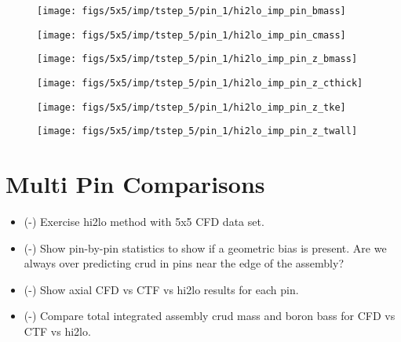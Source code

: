 \begin{figure}[H]
    \centering
    \texttt{[image: figs/5x5/imp/tstep\_5/pin\_1/hi2lo\_imp\_pin\_bmass]}
    \caption{}
    \label{fig:hi2loimppinbmass}
\end{figure}
\begin{figure}[H]
    \centering
    \texttt{[image: figs/5x5/imp/tstep\_5/pin\_1/hi2lo\_imp\_pin\_cmass]}
    \caption{}
    \label{fig:hi2loimppincmass}
\end{figure}
\begin{figure}[H]
    \centering
    \texttt{[image: figs/5x5/imp/tstep\_5/pin\_1/hi2lo\_imp\_pin\_z\_bmass]}
    \caption{}
    \label{fig:hi2loimppinzbmass}
\end{figure}
\begin{figure}[H]
    \centering
    \texttt{[image: figs/5x5/imp/tstep\_5/pin\_1/hi2lo\_imp\_pin\_z\_cthick]}
    \caption{}
    \label{fig:hi2loimppinzcthick}
\end{figure}
\begin{figure}[H]
    \centering
    \texttt{[image: figs/5x5/imp/tstep\_5/pin\_1/hi2lo\_imp\_pin\_z\_tke]}
    \caption{}
    \label{fig:hi2loimppinztke}
\end{figure}
\begin{figure}[H]
    \centering
    \texttt{[image: figs/5x5/imp/tstep\_5/pin\_1/hi2lo\_imp\_pin\_z\_twall]}
    \caption{}
    \label{fig:hi2loimppinztwall}
\end{figure}

\section{Multi Pin Comparisons}

\begin{itemize}
    \item (\checkmark-) Exercise hi2lo method with 5x5 CFD data set.
    \item (\checkmark-) Show pin-by-pin statistics to show if a geometric bias is present.  Are we always over predicting crud
    in pins near the edge of the assembly?
    \item (\checkmark-) Show axial CFD vs CTF vs hi2lo results for each pin.
    \item (\checkmark-) Compare total integrated assembly crud mass and boron bass for CFD vs CTF vs hi2lo.
\end{itemize}

